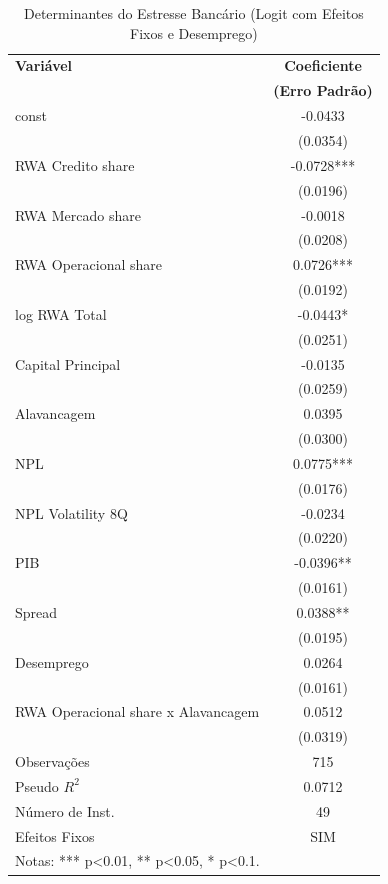 \begin{table}[htbp]
\centering
\caption{Determinantes do Estresse Bancário (Logit com Efeitos Fixos e Desemprego)}
\label{tab:fe_logit_v2}
\begin{tabular}{lc}
\toprule
\textbf{Variável} & \textbf{Coeficiente} \\
                  & \textbf{(Erro Padrão)} \\
\midrule
const & -0.0433 \\
 & (0.0354) \\
\addlinespace
RWA Credito share & -0.0728*** \\
 & (0.0196) \\
\addlinespace
RWA Mercado share & -0.0018 \\
 & (0.0208) \\
\addlinespace
RWA Operacional share & 0.0726*** \\
 & (0.0192) \\
\addlinespace
log RWA Total & -0.0443* \\
 & (0.0251) \\
\addlinespace
Capital Principal & -0.0135 \\
 & (0.0259) \\
\addlinespace
Alavancagem & 0.0395 \\
 & (0.0300) \\
\addlinespace
NPL & 0.0775*** \\
 & (0.0176) \\
\addlinespace
NPL Volatility 8Q & -0.0234 \\
 & (0.0220) \\
\addlinespace
PIB & -0.0396** \\
 & (0.0161) \\
\addlinespace
Spread & 0.0388** \\
 & (0.0195) \\
\addlinespace
Desemprego & 0.0264 \\
 & (0.0161) \\
\addlinespace
RWA Operacional share x Alavancagem & 0.0512 \\
 & (0.0319) \\
\addlinespace
\midrule
Observações & 715 \\
Pseudo $R^2$ & 0.0712 \\
Número de Inst. & 49 \\
Efeitos Fixos & SIM \\
\bottomrule
\multicolumn{2}{l}{\small Notas: *** p<0.01, ** p<0.05, * p<0.1.} \\
\end{tabular}
\end{table}
